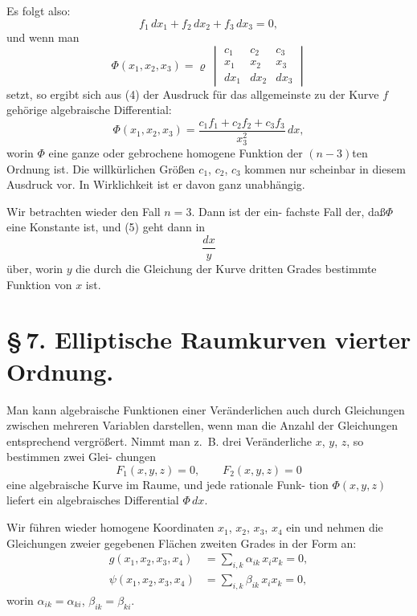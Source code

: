 \documentclass[12pt,a4paper]{book}
\theoremstyle{definition}
\begin{document}
Es folgt also:
\[
f_1 \,dx_1 + f_2 \,dx_2 + f_3 \,dx_3 = 0,
\]
und wenn man
\[
\Phi(x_1, x_2, x_3) = \varrho\,\begin{vmatrix}
c_1 & c_2 & c_3 \\
x_1 & x_2 & x_3 \\
dx_1 & dx_2 & dx_3
\end{vmatrix}
\]
setzt, so ergibt sich aus (4) der Ausdruck f\"ur das allgemeinste
zu der Kurve $f$ geh\"orige algebraische Differential:
\begin{equation}
\Phi(x_1, x_2, x_3) = \frac{c_1 f_1 + c_2 f_2 + c_3 f_3}{x_3^2}\,dx, \tag{5}
\end{equation}
worin $\Phi$ eine ganze oder gebrochene homogene Funktion der
$(n-3)$ten Ordnung ist. Die willk\"urlichen Gr\"o\ss en $c_1$, $c_2$, $c_3$
kommen nur scheinbar in diesem Ausdruck vor. In Wirklichkeit
ist er davon ganz unabh\"angig.

Wir betrachten wieder den Fall $n = 3$. Dann ist der ein-
fachste Fall der, da\ss $\Phi$ eine Konstante ist, und (5) geht dann
in
\[
\frac{dx}{y}
\]
\"uber, worin $y$ die durch die Gleichung der Kurve dritten Grades
bestimmte Funktion von $x$ ist.

\section*{\S\,7. Elliptische Raumkurven vierter Ordnung.}

Man kann algebraische Funktionen einer Ver\"anderlichen auch
durch Gleichungen zwischen mehreren Variablen darstellen, wenn
man die Anzahl der Gleichungen entsprechend vergr\"o\ss ert. Nimmt
man z.~B. drei Ver\"anderliche $x$, $y$, $z$, so bestimmen zwei Glei-
chungen
\[
F_1(x,y,z) = 0, \qquad F_2(x,y,z) = 0
\]
eine algebraische Kurve im Raume, und jede rationale Funk-
tion $\Phi(x,y,z)$ liefert ein algebraisches Differential $\Phi\,dx$.

Wir f\"uhren wieder homogene Koordinaten $x_1$, $x_2$, $x_3$, $x_4$ ein
und nehmen die Gleichungen zweier gegebenen Fl\"achen zweiten
Grades in der Form an:
\begin{equation}
\begin{aligned}
g(x_1, x_2, x_3, x_4) &= \sum_{i,k} \alpha_{ik}\,x_i x_k = 0,\\
\psi(x_1, x_2, x_3, x_4) &= \sum_{i,k} \beta_{ik}\,x_i x_k = 0,
\end{aligned}
\tag{1}
\end{equation}
worin $\alpha_{ik} = \alpha_{ki}$, $\beta_{ik} = \beta_{ki}$.
\end{document}
